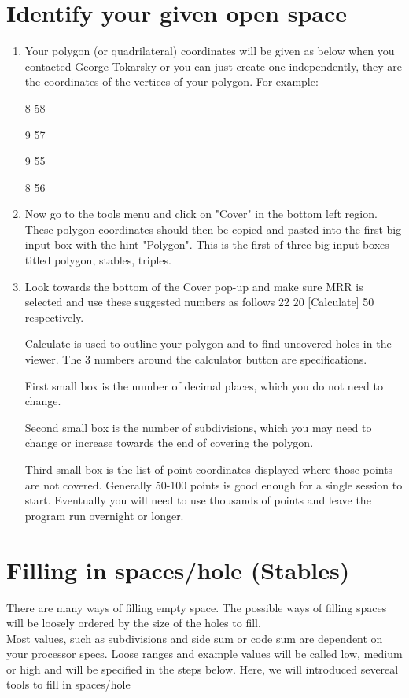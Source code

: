 \documentclass[11pt]{report}
\begin{document}
\section{Identify your given open space}\label{id}
\begin{enumerate}[Step 1.]
  \item Your polygon (or quadrilateral) coordinates will be given as below when you contacted George Tokarsky or you can just create one independently, they are the coordinates of the vertices of your polygon. For example:

  8 58
  
  9 57
  
  9 55
  
  8 56
  
  \item Now go to the tools menu and click on "Cover" in the bottom left region. These polygon coordinates should then be copied and pasted into the first big input box with the hint "Polygon". This is the first of three big input boxes titled polygon, stables, triples. 
  \item Look towards the bottom of the Cover pop-up and make sure MRR is selected and use these suggested
  numbers as follows 22 20 [Calculate] 50 respectively. 

  Calculate is used to outline your polygon and to find uncovered holes in the viewer. The 3 numbers
  around the calculator button are specifications.
  
  First small box is the number of decimal places, which you do not need to change. 
  
  Second small box is the number of subdivisions, which you may need to change or increase towards the end of
  covering the polygon. 

  Third small box is the list of point coordinates displayed where those points are not covered. Generally
  50-100 points is good enough for a single session to start.
  Eventually you will need to use thousands of points and leave the program run overnight or longer.
\end{enumerate}

\section{Filling in spaces/hole (Stables)}
There are many ways of filling empty space. 
The possible ways of filling spaces will be loosely ordered by the size of the holes to fill. \\
Most values, such as subdivisions and side sum or code sum are dependent on your processor specs. 
Loose ranges and example values will be called low, medium or high and will be specified in the steps below.
Here, we will introduced severeal tools to fill in spaces/hole
\end{document}
